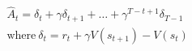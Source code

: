 %
\begin{equation} \label{eqn:Advance_function}
\begin{aligned}
    & \hat{A}_t = \delta_t + \gamma \delta_{t+1} + \dots + \gamma^{T-t+1} \delta_{T-1}\\
    & \text{where}\ \delta_t = r_t + \gamma V(s_{t+1}) -V(s_t)
\end{aligned}
\end{equation}


